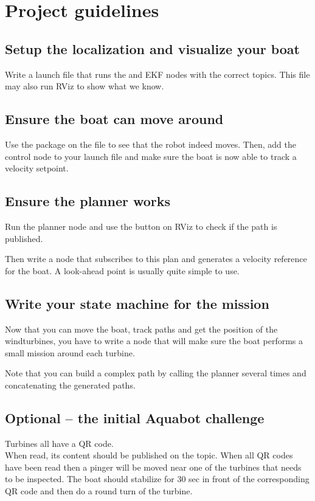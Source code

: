 \documentclass{ecnreport}
\begin{document}
\section{Project guidelines}


\subsection{Setup the localization and visualize your boat}

Write a launch file that runs the  and EKF nodes with the correct topics. This file may also run RViz to show what we know.

\subsection{Ensure the boat can move around}

Use the  package on the  file to see that the robot indeed moves.
Then, add the control node to your launch file and make sure the boat is now able to track a velocity setpoint.

\subsection{Ensure the planner works}

Run the planner node and use the  button on RViz to check if the path is published.

Then write a node that subscribes to this plan and generates a velocity reference for the boat. A look-ahead point is usually quite simple to use.

\subsection{Write your state machine for the mission}

Now that you can move the boat, track paths and get the position of the windturbines, you have to write a node that will make sure the boat performs a small mission around each turbine.

Note that you can build a complex path by calling the planner several times and concatenating the generated paths.

\subsection{Optional -- the initial Aquabot challenge}

  Turbines all have a QR code. \\
  When read, its content should be published on the {\footnotesize {}} topic. When all QR codes have been read then a pinger will be moved near one of the turbines that needs to be inspected. The boat should stabilize for 30 sec in
front of the corresponding QR code and then do a round turn of the turbine.


  
\end{document}
